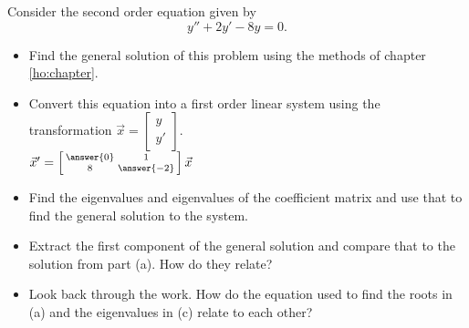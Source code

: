\documentclass{ximera}
\begin{document}
\begin{exercise}
    Consider the second order equation given by
    \begin{equation*}
        y'' + 2y' - 8y = 0.
    \end{equation*}
    \begin{itemize}
        \item Find the general solution of this problem using the methods of chapter \ref{ho:chapter}.
        \item Convert this equation into a first order linear system using the transformation $\vec{x} = \left[ \begin{smallmatrix} y \\ y' \end{smallmatrix} \right]$. \\
            ${\vec{x}}' = \left[\begin{smallmatrix} \answer{0} & 1 \\8 & \answer{-2} \end{smallmatrix}\right]\vec{x}$
        \item Find the eigenvalues and eigenvalues of the coefficient matrix and use that to find the general solution to the system.
        \item Extract the first component of the general solution and compare that to the solution from part (a). How do they relate?
        \item Look back through the work. How do the equation used to find the roots in (a) and the eigenvalues in (c) relate to each other?
    \end{itemize}
\end{exercise}
\end{document}
